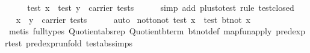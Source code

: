 \begin{isabellebody}
\ \ \isamarkupfalse%
\ \isamarkupfalse%
\ {}test\ x{}\ {}\ test\ y{}\ {}\ carrier\ tests{}\isanewline
\ \ \ \ \isamarkupfalse%
\ {}simp\ add{}\ plus{}to{}test{}\ rule\ test{}closed{}\isanewline
\ \ \isamarkupfalse%
\ \isamarkupfalse%
\ {}x\ {}\ y\ {}\ carrier\ tests{}\isanewline
\ \ \ \ \isamarkupfalse%
\ auto\isanewline
{}\isamarkupfalse%
%
\endisatagproof
{\isafoldproof}%
%
\isadelimproof
\isanewline
%
\endisadelimproof
\isanewline
{}\isamarkupfalse%
\ not{}to{}not{}\ {}{}{}test\ x{}\ {}\ test\ {}bt{}not\ x{}{}\isanewline
%
\isadelimproof
\ \ %
\endisadelimproof
%
\isatagproof
{}\isamarkupfalse%
\ {}metis\ {}full{}types{}\ Quotient{}{}abs{}rep\ Quotient{}{}bterm\ bt{}not{}def\ map{}fun{}apply\ pred{}expr{}test\ pred{}expr{}unfold\ test{}abs{}simps{}{}{}{}%

\end{isabellebody}
